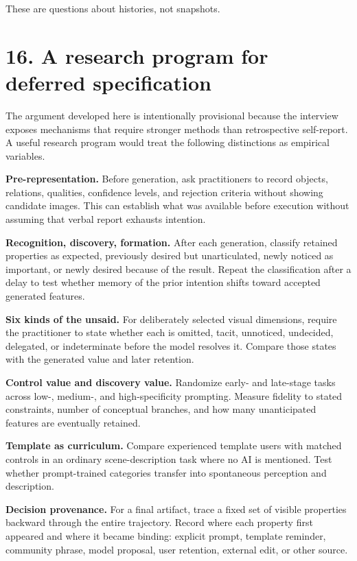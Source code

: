 \documentclass[
  11pt,
  letterpaper,
]{article}
\begin{document}
These are questions about histories, not snapshots.

\section{16. A research program for deferred
specification}\label{a-research-program-for-deferred-specification}

The argument developed here is intentionally provisional because the
interview exposes mechanisms that require stronger methods than
retrospective self-report. A useful research program would treat the
following distinctions as empirical variables.

\textbf{Pre-representation.} Before generation, ask practitioners to
record objects, relations, qualities, confidence levels, and rejection
criteria without showing candidate images. This can establish what was
available before execution without assuming that verbal report exhausts
intention.

\textbf{Recognition, discovery, formation.} After each generation,
classify retained properties as expected, previously desired but
unarticulated, newly noticed as important, or newly desired because of
the result. Repeat the classification after a delay to test whether
memory of the prior intention shifts toward accepted generated features.

\textbf{Six kinds of the unsaid.} For deliberately selected visual
dimensions, require the practitioner to state whether each is omitted,
tacit, unnoticed, undecided, delegated, or indeterminate before the
model resolves it. Compare those states with the generated value and
later retention.

\textbf{Control value and discovery value.} Randomize early- and
late-stage tasks across low-, medium-, and high-specificity prompting.
Measure fidelity to stated constraints, number of conceptual branches,
and how many unanticipated features are eventually retained.

\textbf{Template as curriculum.} Compare experienced template users with
matched controls in an ordinary scene-description task where no AI is
mentioned. Test whether prompt-trained categories transfer into
spontaneous perception and description.

\textbf{Decision provenance.} For a final artifact, trace a fixed set of
visible properties backward through the entire trajectory. Record where
each property first appeared and where it became binding: explicit
prompt, template reminder, community phrase, model proposal, user
retention, external edit, or other source.
\end{document}
